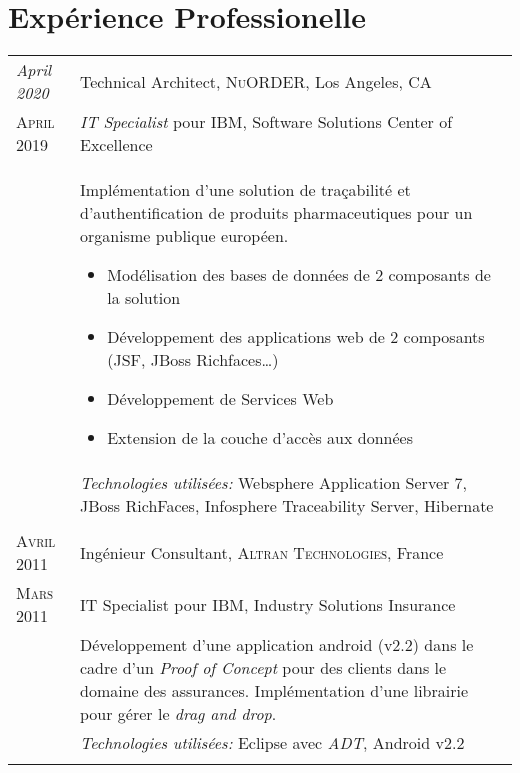 %
%
%

\section{\texorpdfstring{\color{Blue}Expérience Professionelle}{Expérience Professionelle}}
\begin{longtable}{R{2.5cm}|p{14.8cm}}
 	\emph{April 2020} & Technical Architect, \textsc{NuORDER}, Los Angeles, CA\\
 	\textsc{April 2019}& \emph{IT Specialist} pour IBM, Software Solutions Center of Excellence\\&
 	\footnotesize{
 		Implémentation d'une solution de traçabilité et d'authentification
 	 	de produits pharmaceutiques pour un organisme publique européen.
 		\begin{itemize}
			\item Modélisation des bases de données de 2 composants de la solution
			\item Développement des applications web de 2 composants (JSF, JBoss Richfaces\ldots)
			\item Développement de Services Web
			\item Extension de la couche d'accès aux données
		\end{itemize}
		\vspace{-1em}
	}\\&
 	\footnotesize{\emph{Technologies utilisées:} Websphere Application Server 7, JBoss RichFaces, Infosphere Traceability Server, Hibernate }\\
  \\
 	\textsc{Avril 2011} & Ingénieur Consultant, \textsc{Altran Technologies}, France\\
 	\textsc{Mars 2011}& IT Specialist pour IBM, Industry Solutions Insurance\\&
 	\footnotesize{Développement d'une application android (v2.2) dans le cadre d'un \emph{Proof of Concept}
 	pour des clients dans le domaine des assurances. Implémentation d'une librairie pour gérer le \emph{drag and drop}.}\\&
 	\footnotesize{\emph{Technologies utilisées:} Eclipse avec \emph{ADT}, Android v2.2 }\\
 \\

\end{longtable}
